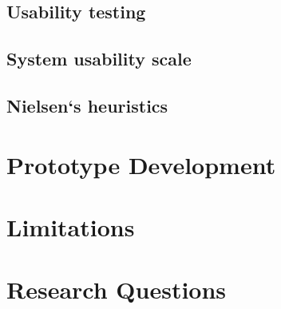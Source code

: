 \subsection{Usability testing}
\subsection{System usability scale}
\subsection{Nielsen`s heuristics}
\section{Prototype Development}

\section{Limitations}

\section{Research Questions}
